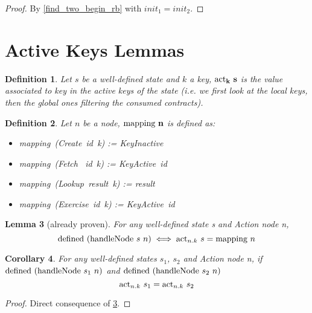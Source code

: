 \documentclass{article}
\newtheorem{lemma}{Lemma}
\newtheorem{definition}[lemma]{Definition}
\newtheorem{corollary}[lemma]{Corollary}
\newcommand{\textfun}[1]{\textup{#1}}
\newcommand{\bolddef}[1]{\textbf{\ensuremath{\mathbf{#1}}}}
\newcommand{\fetchNode}[2]{\textfun{Fetch} \ #1\ #2}
\newcommand{\lookupNode}[2]{\textfun{Lookup}\ #1\ #2}
\newcommand{\createNode}[2]{\textfun{Create}\ #1\ #2}
\newcommand{\exNode}[2]{\textfun{Exercise}\ #1\ #2}
\newcommand{\hNode}[2]{\textfun{handleNode}\ #1\ #2}
\newcommand{\defined}[1]{\textfun{defined}\ #1}
\newcommand{\mapping}[1]{\textfun{mapping}\ #1}
\newcommand{\keyAct}[1]{\textfun{KeyActive}\ #1}
\newcommand{\keyInact}{\textfun{KeyInactive}}
\newcommand{\actkey}[2]{\textfun{act}_{#1}\ #2}
\begin{document}
\begin{proof}
    By \cref{find_two_begin_rb} with $init_1 = init_2$.
\end{proof}









\newpage


\section*{Active Keys Lemmas}

\begin{definition}
    Let $s$ be a well-defined state and $k$ a key, \bolddef{\actkey{k}{s}} is the value associated to key in the active keys of the state 
    (i.e. we first look at the local keys, then the global ones filtering the consumed contracts).
\end{definition}

\begin{definition}
    Let $n$ be a node, \bolddef{\mapping{n}} is defined as:
    \begin{itemize}
        \item \mapping{(\createNode{id}{k})} := \keyInact
        \item \mapping{(\fetchNode{id}{k})} := \keyAct{id}
        \item \mapping{(\lookupNode{result}{k})} := result
        \item \mapping{(\exNode{id}{k})} := \keyAct{id}
    \end{itemize}
\end{definition}

\begin{lemma}[already proven]
    \label{defined_def}
    For any well-defined state s and Action node n, 
    \[\defined{(\hNode{s}{n})} \iff {\actkey{n.k}{s} = \mapping{n}}\]
\end{lemma}


\begin{corollary}
    \label{same_key_hnode}
    For any well-defined states $s_1$, $s_2$ and Action node n, if $\defined{(\hNode{s_ 1}{n})}$ and $\defined{(\hNode{s_ 2}{n})}$ 
    \[\actkey{n.k}{s_1} = \actkey{n.k}{s_2}\]
\end{corollary}

\begin{proof}
    Direct consequence of \cref{defined_def}.
\end{proof}
\end{document}
